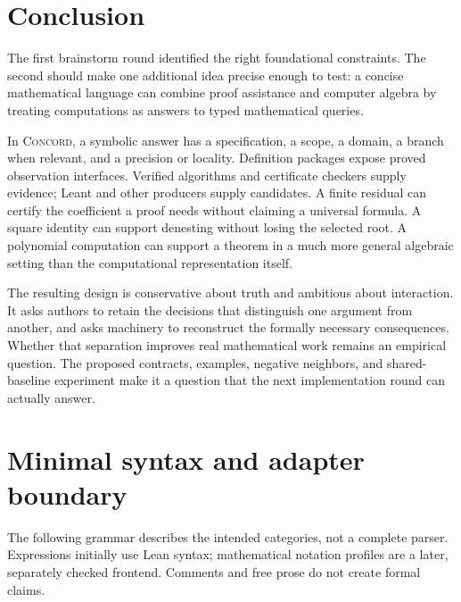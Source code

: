 \documentclass[11pt,a4paper]{article}
\newcommand{\Concord}{\textsc{Concord}}
\theoremstyle{definition}
\begin{document}
\section{Conclusion}
The first brainstorm round identified the right foundational constraints. The second should make one additional idea precise enough to test: a concise mathematical language can combine proof assistance and computer algebra by treating computations as answers to typed mathematical queries.

In \Concord{}, a symbolic answer has a specification, a scope, a domain, a branch when relevant, and a precision or locality. Definition packages expose proved observation interfaces. Verified algorithms and certificate checkers supply evidence; Leant and other producers supply candidates. A finite residual can certify the coefficient a proof needs without claiming a universal formula. A square identity can support denesting without losing the selected root. A polynomial computation can support a theorem in a much more general algebraic setting than the computational representation itself.

The resulting design is conservative about truth and ambitious about interaction. It asks authors to retain the decisions that distinguish one argument from another, and asks machinery to reconstruct the formally necessary consequences. Whether that separation improves real mathematical work remains an empirical question. The proposed contracts, examples, negative neighbors, and shared-baseline experiment make it a question that the next implementation round can actually answer.

\clearpage
\appendix
\section{Minimal syntax and adapter boundary}\label{app:grammar}

The following grammar describes the intended categories, not a complete parser. Expressions initially use Lean syntax; mathematical notation profiles are a later, separately checked frontend. Comments and free prose do not create formal claims.
\end{document}
